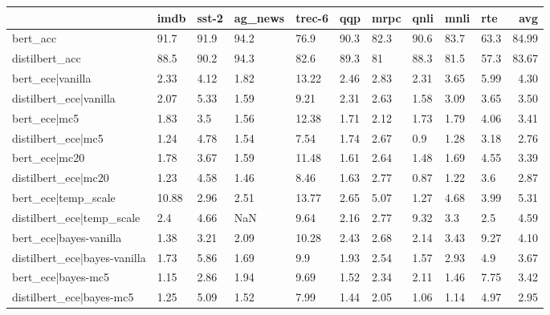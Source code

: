 \begin{tabular}{llllllllllr}
\toprule
{} &   imdb & sst-2 & ag\_news & trec-6 &   qqp &  mrpc &  qnli &  mnli &   rte &    avg \\
\midrule
bert\_acc                     &   91.7 &  91.9 &    94.2 &   76.9 &  90.3 &  82.3 &  90.6 &  83.7 &  63.3 &  84.99 \\
distilbert\_acc               &   88.5 &  90.2 &    94.3 &   82.6 &  89.3 &    81 &  88.3 &  81.5 &  57.3 &  83.67 \\
bert\_ece|vanilla             &   2.33 &  4.12 &    1.82 &  13.22 &  2.46 &  2.83 &  2.31 &  3.65 &  5.99 &   4.30 \\
distilbert\_ece|vanilla       &   2.07 &  5.33 &    1.59 &   9.21 &  2.31 &  2.63 &  1.58 &  3.09 &  3.65 &   3.50 \\
bert\_ece|mc5                 &   1.83 &   3.5 &    1.56 &  12.38 &  1.71 &  2.12 &  1.73 &  1.79 &  4.06 &   3.41 \\
distilbert\_ece|mc5           &   1.24 &  4.78 &    1.54 &   7.54 &  1.74 &  2.67 &   0.9 &  1.28 &  3.18 &   2.76 \\
bert\_ece|mc20                &   1.78 &  3.67 &    1.59 &  11.48 &  1.61 &  2.64 &  1.48 &  1.69 &  4.55 &   3.39 \\
distilbert\_ece|mc20          &   1.23 &  4.58 &    1.46 &   8.46 &  1.63 &  2.77 &  0.87 &  1.22 &   3.6 &   2.87 \\
bert\_ece|temp\_scale          &  10.88 &  2.96 &    2.51 &  13.77 &  2.65 &  5.07 &  1.27 &  4.68 &  3.99 &   5.31 \\
distilbert\_ece|temp\_scale    &    2.4 &  4.66 &     NaN &   9.64 &  2.16 &  2.77 &  9.32 &   3.3 &   2.5 &   4.59 \\
bert\_ece|bayes-vanilla       &   1.38 &  3.21 &    2.09 &  10.28 &  2.43 &  2.68 &  2.14 &  3.43 &  9.27 &   4.10 \\
distilbert\_ece|bayes-vanilla &   1.73 &  5.86 &    1.69 &    9.9 &  1.93 &  2.54 &  1.57 &  2.93 &   4.9 &   3.67 \\
bert\_ece|bayes-mc5           &   1.15 &  2.86 &    1.94 &   9.69 &  1.52 &  2.34 &  2.11 &  1.46 &  7.75 &   3.42 \\
distilbert\_ece|bayes-mc5     &   1.25 &  5.09 &    1.52 &   7.99 &  1.44 &  2.05 &  1.06 &  1.14 &  4.97 &   2.95 \\
\bottomrule
\end{tabular}
